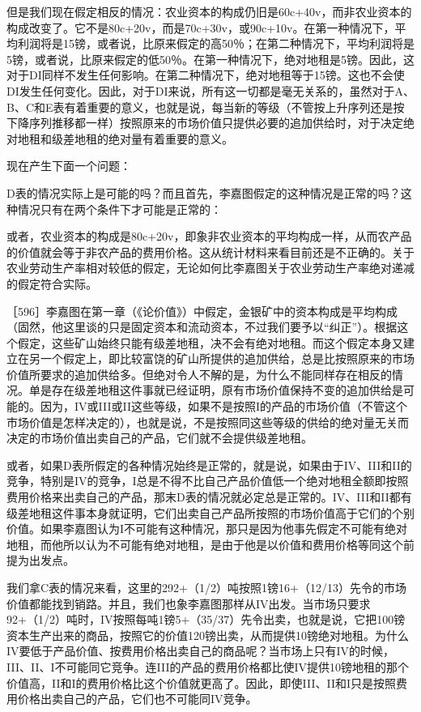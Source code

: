 但是我们现在假定相反的情况：农业资本的构成仍旧是60c+40v，而非农业资本的构成改变了。它不是80c+20v，而是70c+30v，或90c+10v。在第一种情况下，平均利润将是15镑，或者说，比原来假定的高50％；在第二种情况下，平均利润将是5镑，或者说，比原来假定的低50％。在第一种情况下，绝对地租是5镑。因此，这对于DI同样不发生任何影响。在第二种情况下，绝对地租等于15镑。这也不会使DI发生任何变化。因此，对于DI来说，所有这一切都是毫无关系的，虽然对于A、B、C和E表有着重要的意义，也就是说，每当新的等级（不管按上升序列还是按下降序列推移都一样）按照原来的市场价值只提供必要的追加供给时，对于决定绝对地租和级差地租的绝对量有着重要的意义。


现在产生下面一个问题：

D表的情况实际上是可能的吗？而且首先，李嘉图假定的这种情况是正常的吗？这种情况只有在两个条件下才可能是正常的：

或者，农业资本的构成是80c+20v，即象非农业资本的平均构成一样，从而农产品的价值就会等于非农产品的费用价格。这从统计材料来看目前还是不正确的。关于农业劳动生产率相对较低的假定，无论如何比李嘉图关于农业劳动生产率绝对递减的假定符合实际。

［596］李嘉图在第一章（《论价值》）中假定，金银矿中的资本构成是平均构成（固然，他这里谈的只是固定资本和流动资本，不过我们要予以“纠正”）。根据这个假定，这些矿山始终只能有级差地租，决不会有绝对地租。而这个假定本身又建立在另一个假定上，即比较富饶的矿山所提供的追加供给，总是比按照原来的市场价值所要求的追加供给多。但绝对令人不解的是，为什么不能同样存在相反的情况。单是存在级差地租这件事就已经证明，原有市场价值保持不变的追加供给是可能的。因为，IV或III或II这些等级，如果不是按照I的产品的市场价值（不管这个市场价值是怎样决定的），也就是说，不是按照同这些等级的供给的绝对量无关而决定的市场价值出卖自己的产品，它们就不会提供级差地租。

或者，如果D表所假定的各种情况始终是正常的，就是说，如果由于IV、III和II的竞争，特别是IV的竞争，I总是不得不比自己产品价值低一个绝对地租全额即按照费用价格来出卖自己的产品，那末D表的情况就必定总是正常的。IV、III和II都有级差地租这件事本身就证明，它们出卖自己产品所按照的市场价值高于它们的个别价值。如果李嘉图认为I不可能有这种情况，那只是因为他事先假定不可能有绝对地租，而他所以认为不可能有绝对地租，是由于他是以价值和费用价格等同这个前提为出发点。

我们拿C表的情况来看，这里的292+（1/2）吨按照1镑16+（12/13）先令的市场价值都能找到销路。并且，我们也象李嘉图那样从IV出发。当市场只要求92+（1/2）吨时，IV按照每吨1镑5+（35/37）先令出卖，也就是说，它把100镑资本生产出来的商品，按照它的价值120镑出卖，从而提供10镑绝对地租。为什么IV要低于产品价值、按费用价格出卖自己的商品呢？当市场上只有IV的时候，III、II、I不可能同它竞争。连III的产品的费用价格都比使IV提供10镑地租的那个价值高，II和I的费用价格比这个价值就更高了。因此，即使III、II和I只是按照费用价格出卖自己的产品，它们也不可能同IV竞争。

